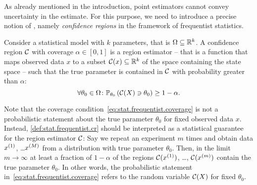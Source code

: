 As already mentioned in the introduction, point estimators cannot convey uncertainty in the estimate.
For this purpose, we need to introduce a precise notion of , namely \emph{confidence regions} in the framework of frequentist statistics.
\begin{definition}\label{def:stat.frequentist.cr}
  Consider a statistical model with $k$ parameters, that is $\Omega \subseteq {\mathbb{R}}^k$.
  A confidence region $\mathcal{C}$ with coverage $\alpha \in [0,1]$ is a region estimator -- that is a function that maps observed data $x$ to a subset $\mathcal{C}(x) \subseteq {\mathbb{R}}^k$ of the space containing the state space -- such that the true parameter is contained in $\mathcal{C}$ with probability greater than $\alpha$:
  \[
    \label{eq:stat.frequentist.coverage}
    \forall \theta_0\in\Omega \colon \mathbb{P}_{\theta_0}\left( \mathcal{C}(X) \ni \theta_0 \right) \ge 1 - \alpha.
  \]
\end{definition}
Note that the coverage condition~\eqref{eq:stat.frequentist.coverage} is not a probabilistic statement about the true parameter $\theta_0$ for fixed observed data $x$.
Instead, \cref{def:stat.frequentist.cr} should be interpreted as a statistical guarantee for the region estimator $\mathcal{C}$:
Say we repeat an experiment $m$ times and obtain data $x^{(1)}$, \ldots $x^{(M)}$ from a distribution with true parameter $\theta_0$.
Then, in the limit $m \to \infty$ at least a fraction of $1-\alpha$ of the regions $\mathcal{C}(x^{(1)})$, \ldots, $\mathcal{C}(x^{(m)})$ contain the true parameter $\theta_0$.
In other words, the probabilistic statement in~\eqref{eq:stat.frequentist.coverage} refers to the random variable $\mathcal{C}(X)$ for fixed $\theta_0$.

